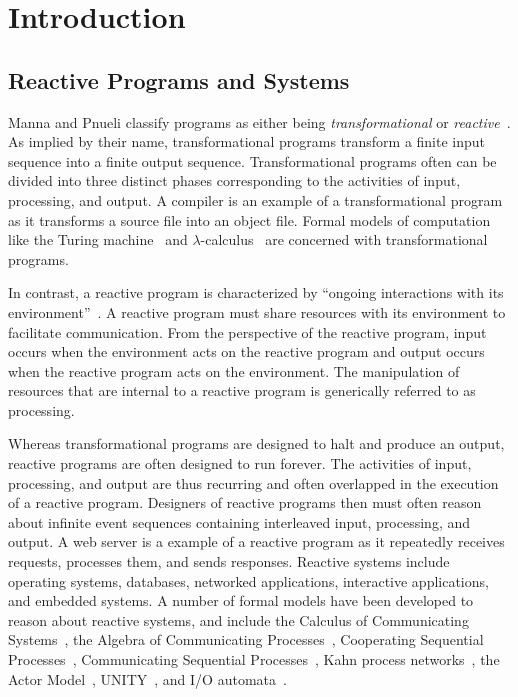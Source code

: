 \chapter{Introduction}
\label{introduction}

\section{Reactive Programs and Systems}

Manna and Pnueli classify programs as either being \emph{transformational} or \emph{reactive}~\cite{manna1992temporal}.
As implied by their name, transformational programs transform a finite input sequence into a finite output sequence.
Transformational programs often can be divided into three distinct phases corresponding to the activities of input, processing, and output.
A compiler is an example of a transformational program as it transforms a source file into an object file.
Formal models of computation like the Turing machine~\cite{turing1936computable} and $\lambda$-calculus~\cite{church1936unsolvable} are concerned with transformational programs.

In contrast, a reactive program is characterized by ``ongoing interactions with its environment''~\cite{manna1992temporal}.
A reactive program must share resources with its environment to facilitate communication.
From the perspective of the reactive program, input occurs when the environment acts on the reactive program and output occurs when the reactive program acts on the environment.
The manipulation of resources that are internal to a reactive program is generically referred to as processing.

Whereas transformational programs are designed to halt and produce an output, reactive programs are often designed to run forever.
The activities of input, processing, and output are thus recurring and often overlapped in the execution of a reactive program.
Designers of reactive programs then must often reason about infinite event sequences containing interleaved input, processing, and output.
A web server is a example of a reactive program as it repeatedly receives requests, processes them, and sends responses.
Reactive systems include operating systems, databases, networked applications, interactive applications, and embedded systems.
A number of formal models have been developed to reason about reactive systems, and include the Calculus of Communicating Systems~\cite{milner1982calculus}, the Algebra of Communicating Processes~\cite{bergstra1982fixed}, Cooperating Sequential Processes~\cite{dijkstra1965cooperating}, Communicating Sequential Processes~\cite{hoare1978communicating}, Kahn process networks~\cite{kahn1974semantics}, the Actor Model~\cite{hewitt1973universal}\cite{clinger1981foundations}\cite{agha1985actors}, UNITY~\cite{chandy1989parallel}, and I/O automata~\cite{nancy1996distributed}.

